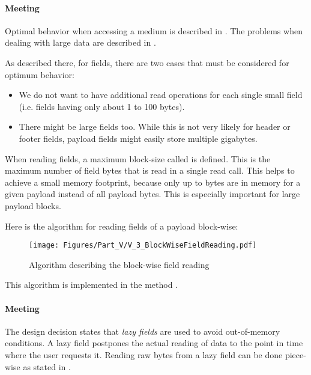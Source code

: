 \paragraph{Meeting \REQUfieldEfficientReading{}}
\label{sec:MeetingREQUfieldEfficientReading}

Optimal behavior when accessing a medium is described in . The problems when dealing with large data are described in .

As described there, for fields, there are two cases that must be considered for optimum behavior:
\begin{itemize}
	\item We do not want to have additional read operations for each single small field (i.e. fields having only about 1 to 100 bytes).
	\item There might be large fields too. While this is not very likely for header or footer fields, payload fields might easily store multiple gigabytes.
\end{itemize}

When reading fields, a maximum block-size called \CONSTfieldBlockSize{} is defined. This is the maximum number of field bytes that is read in a single read call. This helps to achieve a small memory footprint, because only up to \CONSTfieldBlockSize{} bytes are in memory for a given payload instead of all payload bytes. This is especially important for large payload blocks.

Here is the algorithm for reading fields of a payload block-wise:

\begin{figure}[H]
	\centering
	\texttt{[image: Figures/Part\_V/V\_3\_BlockWiseFieldReading.pdf]}
	\caption{Algorithm describing the block-wise field reading}
	\label{fig:V_3_BlockWiseFieldReading}
\end{figure}

This algorithm is implemented in the method \METHreadField{}.


\paragraph{Meeting \REQUfieldLargeFields{}}
\label{sec:MeetingREQUfieldLargeFields}

The design decision  states that \emph{lazy fields} are used to avoid out-of-memory conditions. A lazy field postpones the actual reading of data to the point in time where the user requests it. Reading raw bytes from a lazy field can be done piece-wise as stated in .

